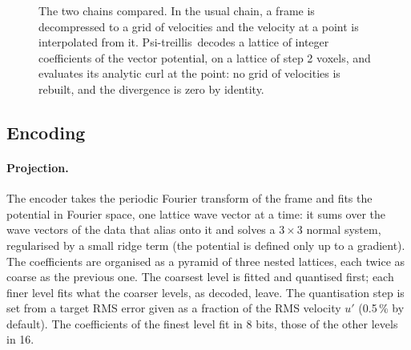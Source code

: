 \documentclass[11pt,a4paper]{article}
\newcommand{\urms}{u'}
\newcommand{\codec}{Psi-treillis}
\begin{document}
\begin{figure}[t]
  \centering
  \caption{The two chains compared. In the usual chain, a frame is decompressed to a grid of velocities and the
  velocity at a point is interpolated from it. \codec\ decodes a lattice of integer coefficients of the vector
  potential, on a lattice of step 2 voxels, and evaluates its analytic curl at the point: no grid of velocities is
  rebuilt, and the divergence is zero by identity.}
  \label{fig:chains}
\end{figure}

\subsection{Encoding}

\paragraph{Projection.}
The encoder takes the periodic Fourier transform of the frame and fits the potential in Fourier space, one lattice wave
vector at a time: it sums over the wave vectors of the data that alias onto it and solves a $3\times3$ normal system,
regularised by a small ridge term (the potential is defined only up to a gradient). The coefficients are organised as
a pyramid of three nested lattices, each twice as coarse as the previous one. The coarsest level is fitted and
quantised first; each finer level fits what the coarser levels, as decoded, leave. The quantisation step is set from a
target RMS error given as a fraction of the RMS velocity $\urms$ (0.5\,\% by default). The coefficients of the finest
level fit in 8 bits, those of the other levels in 16.
\end{document}
